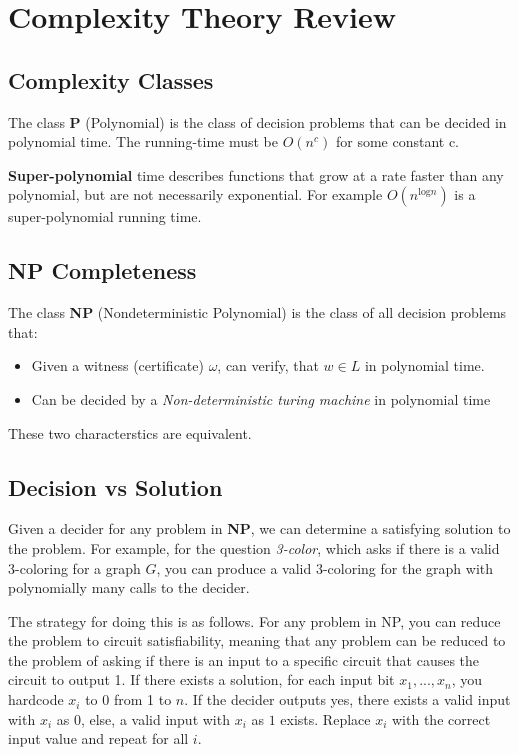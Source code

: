 \documentclass[11pt]{article}
\begin{document}
\section{Complexity Theory Review}

\subsection{Complexity Classes}
The class \textbf{P} (Polynomial) is the class of decision problems that can be decided in polynomial time. The running-time must be $O(n^c)$ for some constant c.
\vspace{1em}

\textbf{Super-polynomial} time describes functions that grow at a rate faster than any polynomial, but are not necessarily exponential. For example $O(n^{\text{log}n})$ is a super-polynomial running time.

\subsection{NP Completeness}
The class \textbf{NP} (Nondeterministic Polynomial) is the class of all decision problems that:

\begin{itemize}
\item Given a witness (certificate) $\omega$, can verify, that $w \in L$ in polynomial time.
\item Can be decided by a \textit{Non-deterministic turing machine} in polynomial time
\end{itemize}
These two characterstics are equivalent.

\subsection{Decision vs Solution}
Given a decider for any problem in \textbf{NP}, we can determine a satisfying solution to the problem. For example, for the question \textit{3-color}, which asks if there is a valid 3-coloring for a graph $G$, you can produce a valid 3-coloring for the graph with polynomially many calls to the decider. 
\vspace{1em}

The strategy for doing this is as follows. For any problem in NP, you can reduce the problem to circuit satisfiability, meaning that any problem can be reduced to the problem of asking if there is an input to a specific circuit that causes the circuit to output 1. If there exists a solution, for each input bit $x_1,...,x_n$, you hardcode $x_i$ to $0$ from 1 to $n$. If the decider outputs yes, there exists a valid input with $x_i$ as $0$, else, a valid input with $x_i$ as $1$ exists. Replace $x_i$ with the correct input value and repeat for all $i$.
\end{document}
